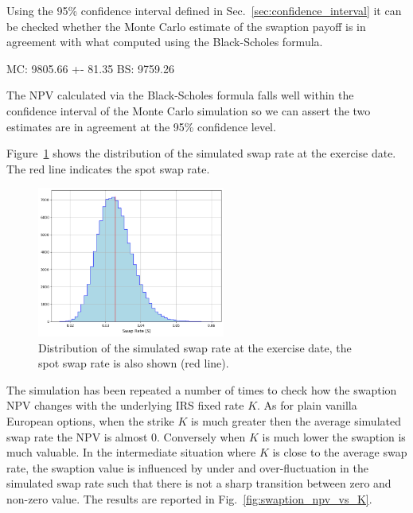 
Using the 95\% confidence interval defined in Sec.~\ref{sec:confidence_interval} it can be checked whether the Monte Carlo estimate of the swaption payoff is in agreement with what computed using the Black-Scholes formula.

\begin{ioutput}
MC: 9805.66 +- 81.35
BS: 9759.26
\end{ioutput}

The NPV calculated via the Black-Scholes formula falls well within the confidence interval of the Monte Carlo simulation so we can assert the two estimates are in agreement at the 95\% confidence level.

Figure~\ref{fig:swap_rate} shows the distribution of the simulated swap rate at the exercise date. The red line indicates the spot swap rate.

\begin{figure}[htb]
	\centering
	\includegraphics[width=0.55\textwidth]{figures/simulated_swap_rate}
	\caption{Distribution of the simulated swap rate at the exercise date, the spot swap rate is also shown (red line).}
	\label{fig:swap_rate}
\end{figure}

The simulation has been repeated a number of times to check how the swaption NPV changes with the underlying IRS fixed rate $K$. As for plain vanilla European options, when the strike $K$ is much greater then the average simulated swap rate the NPV is almost 0. Conversely when $K$ is much lower the swaption is much valuable. In the intermediate situation where $K$ is close to the average swap rate, the swaption value is influenced by under and over-fluctuation in the simulated swap rate such that there is not a sharp transition between zero and non-zero value.
The results are reported in Fig.~\ref{fig:swaption_npv_vs_K}.


